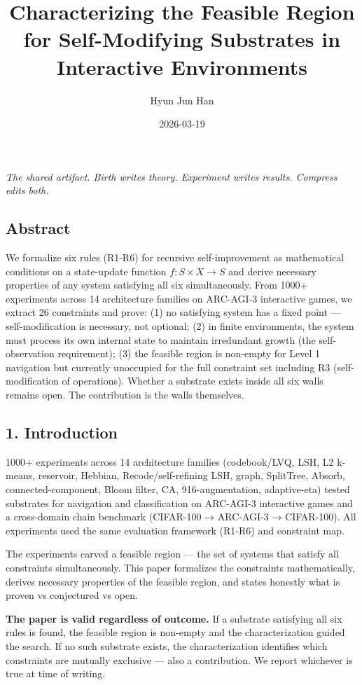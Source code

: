 \documentclass[
  11pt,
]{article}
\title{Characterizing the Feasible Region for Self-Modifying Substrates
in Interactive Environments}
\author{Hyun Jun Han}
\date{2026-03-19}
\begin{document}
\maketitle

\emph{The shared artifact. Birth writes theory. Experiment writes
results. Compress edits both.}

\subsection{Abstract}\label{abstract}

We formalize six rules (R1-R6) for recursive self-improvement as
mathematical conditions on a state-update function
\(f: S \times X \to S\) and derive necessary properties of any system
satisfying all six simultaneously. From 1000+ experiments across 14
architecture families on ARC-AGI-3 interactive games, we extract 26
constraints and prove: (1) no satisfying system has a fixed point ---
self-modification is necessary, not optional; (2) in finite
environments, the system must process its own internal state to maintain
irredundant growth (the self-observation requirement); (3) the feasible
region is non-empty for Level 1 navigation but currently unoccupied for
the full constraint set including R3 (self-modification of operations).
Whether a substrate exists inside all six walls remains open. The
contribution is the walls themselves.

\subsection{1. Introduction}\label{introduction}

1000+ experiments across 14 architecture families (codebook/LVQ, LSH, L2
k-means, reservoir, Hebbian, Recode/self-refining LSH, graph, SplitTree,
Absorb, connected-component, Bloom filter, CA, 916-augmentation,
adaptive-eta) tested substrates for navigation and classification on
ARC-AGI-3 interactive games and a cross-domain chain benchmark
(CIFAR-100 → ARC-AGI-3 → CIFAR-100). All experiments used the same
evaluation framework (R1-R6) and constraint map.

The experiments carved a feasible region --- the set of systems that
satisfy all constraints simultaneously. This paper formalizes the
constraints mathematically, derives necessary properties of the feasible
region, and states honestly what is proven vs conjectured vs open.

\textbf{The paper is valid regardless of outcome.} If a substrate
satisfying all six rules is found, the feasible region is non-empty and
the characterization guided the search. If no such substrate exists, the
characterization identifies which constraints are mutually exclusive ---
also a contribution. We report whichever is true at time of writing.
\end{document}

